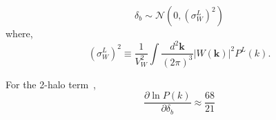 \documentclass[preprint]{aastex}
\newcommand{\kv}{\mathbf{k}}
\newcommand{\normdist}{\mathcal{N}}
\begin{document}
\begin{equation}
	\delta_b \sim \normdist
	\left(0, \left(\sigma_W^L\right)^{2}\right)
\end{equation}
where,
\begin{equation}
	\left(\sigma_{W}^{L}\right)^{2} \equiv
	\frac{1}{V_{W}^{2}} 
	\int \frac{d^{2}\kv}{(2\pi)^3}
	\left|W(\kv)\right|^{2}
	P^{L}(k).
\end{equation}

For the 2-halo term~\citep[eq. 39 of][]{takada2013}, 
\begin{equation}
	\frac{\partial \ln P(k)}{\partial \delta_b} \approx 
	\frac{68}{21}
\end{equation}




\end{document}
